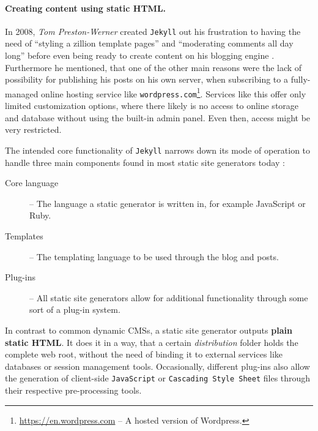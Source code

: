 \paragraph{Creating content using static HTML.}
\label{par:creatingcontent}
In 2008, \emph{Tom Preston-Werner} created \texttt{Jekyll} out his frustration to having the need of ``styling a zillion template pages'' and ``moderating comments all day long'' before even being ready to create content on his blogging engine \cite[]{PrestonWerner2008jekyll}. Furthermore he mentioned, that one of the other main reasons were the lack of possibility for publishing his posts on his own server, when subscribing to a fully-managed online hosting service like \texttt{wordpress.com}\footnote{\url{https://en.wordpress.com} -- A hosted version of Wordpress.}. Services like this offer only limited customization options, where there likely is no access to online storage and database without using the built-in admin panel. Even then, access might be very restricted.

The intended core functionality of \texttt{Jekyll} narrows down its mode of operation to handle three main components found in most static site generators today \cite[24]{dhillon2016}:

\begin{description}
  \item [Core language] -- The language a static generator is written in, for example JavaScript or Ruby.
  \item [Templates] -- The templating language to be used through the blog and posts.
  \item [Plug-ins] -- All static site generators allow for additional functionality through some
sort of a plug-in system.
\end{description}

In contrast to common dynamic CMSs, a static site generator outputs \textbf{plain static HTML}. It does it in a way, that a certain \emph{distribution} folder holds the complete web root, without the need of binding it to external services like databases or session management tools. Occasionally, different plug-ins also allow the generation of client-side \texttt{JavaScript} or \texttt{Cascading Style Sheet} files through their respective pre-processing tools.


